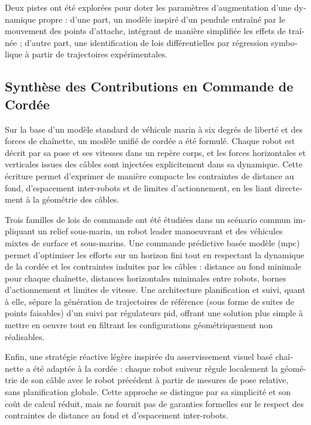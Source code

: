 \begin{otherlanguage}{french}
	Deux pistes ont été explorées pour doter les paramètres d'augmentation d'une dynamique propre :
	d'une part, un modèle inspiré d'un pendule entraîné par le mouvement des points d'attache,
	intégrant de manière simplifiée les effets de traînée ; d'autre part, une identification de lois
	différentielles par régression symbolique à partir de trajectoires expérimentales.

	\subsection{Synthèse des Contributions en Commande de Cordée}

	Sur la base d'un modèle standard de véhicule marin à six degrés de liberté et des forces de
	chaînette, un modèle unifié de cordée a été formulé. Chaque robot est décrit par sa pose et ses
	vitesses dans un repère corps, et les forces horizontales et verticales issues des câbles sont
	injectées explicitement dans sa dynamique. Cette écriture permet d'exprimer de manière compacte les
	contraintes de distance au fond, d'espacement inter-robots et de limites d'actionnement, en les
	liant directement à la géométrie des câbles.

	Trois familles de lois de commande ont été étudiées dans un scénario commun impliquant un relief
	sous-marin, un robot leader manoeuvrant et des véhicules mixtes de surface et sous-marins. Une
	commande prédictive basée modèle (\ac{mpc}) permet d'optimiser les efforts sur un horizon fini tout
	en respectant la dynamique de la cordée et les contraintes induites par les câbles : distance au
	fond minimale pour chaque chaînette, distances horizontales minimales entre robots, bornes
	d'actionnement et limites de vitesse. Une architecture planification et suivi, quant à elle, sépare
	la génération de trajectoires de référence (sous forme de suites de points faisables) d'un suivi
	par régulateurs \ac{pid}, offrant une solution plus simple à mettre en oeuvre tout en filtrant les
	configurations géométriquement non réalisables.

	Enfin, une stratégie réactive légère inspirée du asservissement visuel basé chaînette a été adaptée
	à la cordée : chaque robot suiveur régule localement la géométrie de son câble avec le robot
	précédent à partir de mesures de pose relative, sans planification globale. Cette approche se
	distingue par sa simplicité et son coût de calcul réduit, mais ne fournit pas de garanties
	formelles sur le respect des contraintes de distance au fond et d'espacement inter-robots.


\end{otherlanguage}
